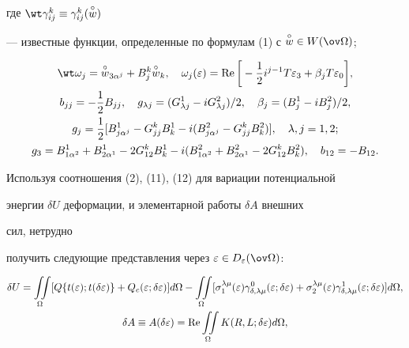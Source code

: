 где $\wt\gamma^k_{ij}\equiv\gamma^k_{ij}(\up{\circ}{w})$ 


--- известные функции, определенные по формулам (1) с $\up{\circ}{w}\in 


W(\ov\Omega)$; 


\begin{gather} 


\wt\omega_j=\up{\circ}{w}_{3\alpha^j}+B^k_j\up{\circ}{w}_k,\quad 


\omega_j(\varepsilon)=\re\bigg[-\frac{1}{2}i^{j-1} 


T\varepsilon_3+\beta_j T\varepsilon_0\bigg],\notag \\ 


% 


b_{jj}=-\frac{1}{2}B_{jj},\quad g_{\lambda j}=(G^1_{\lambda j}- 


i G^2_{\lambda j})/2,\quad \beta_j=(B^1_j-i B^2_j)/2,\notag \\ 


% 


g_j=\frac{1}{2}[B^1_{j\alpha^j}-G^k_{jj}B^1_k-i(B^2_{j\alpha^j}- 


G^k_{jj}B^2_k)],\quad \lambda,j=1,2; \\ 


% 


g_3=B^1_{1\alpha^2}+B^1_{2\alpha^1}-2G^k_{12}B^1_k 


-i(B^2_{1\alpha^2}+B^2_{2\alpha^1}-2G^k_{12}B^2_k), 


\quad b_{12}=-B_{12}.\notag 


\end{gather} 


 


Используя соотношения (2), (11), (12) для вариации потенциальной 


энергии $\delta U$ деформации, и элементарной работы $\delta A$ внешних 


сил, нетрудно 


получить следующие представления через $\varepsilon\in 


D_\varepsilon(\ov\Omega)$: 


\begin{gather} 


\delta U=\iint\limits_\Omega[Q\{t(\varepsilon); 


t(\delta\varepsilon)\}+Q_c(\varepsilon;\delta\varepsilon)]d\Omega- 


\iint\limits_\Omega[\sigma^{\lambda\mu}_1(\varepsilon) 


\gamma^0_{\delta,\lambda\mu}(\varepsilon;\delta\varepsilon)+ 


\sigma^{\lambda\mu}_2(\varepsilon) 


\gamma^1_{\delta,\lambda\mu}(\varepsilon;\delta\varepsilon) 


]d\Omega, \\ 


% 


\delta A\equiv A(\delta\varepsilon)=\re\iint\limits_\Omega 


K(R,L;\delta\varepsilon)d\Omega, 


\end{gather} 


